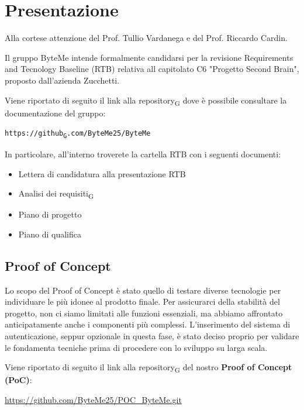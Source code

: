 \documentclass[11pt,a4paper]{article}
\newcommand{\gls}[1]{#1\textsubscript{G}}
\begin{document}
\newpage

\tableofcontents
\thispagestyle{empty}
\newpage

\setcounter{page}{1}

\section{Presentazione}
Alla cortese attenzione del Prof. Tullio Vardanega e del Prof. Riccardo Cardin.

Il gruppo ByteMe intende formalmente candidarsi per la revisione Requirements and Tecnology Baseline (RTB) relativa all capitolato C6 "Progetto Second Brain", proposto dall'azienda Zucchetti.

Viene riportato di seguito il link alla \gls{repository} dove è possibile consultare la documentazione del gruppo:
\begin{center}
\texttt{https://\gls{github}.com/ByteMe25/ByteMe}
\end{center}

\noindent In particolare, all'interno troverete la cartella RTB con i seguenti documenti:
\begin{itemize}
    \item Lettera di candidatura alla presentazione RTB
    \item \gls{Analisi dei requisiti}
    \item Piano di progetto
    \item Piano di qualifica
\end{itemize}


\subsection{Proof of Concept}
Lo scopo del Proof of Concept è stato quello di testare diverse tecnologie per individuare le più idonee al prodotto finale. Per assicurarci della stabilità del progetto, non ci siamo limitati alle funzioni essenziali, ma abbiamo affrontato anticipatamente anche i componenti più complessi. L'inserimento del sistema di autenticazione, seppur opzionale in questa fase, è stato deciso proprio per validare le fondamenta tecniche prima di procedere con lo sviluppo su larga scala.

Viene riportato di seguito il link alla \gls{repository} del nostro \textbf{Proof of Concept (PoC)}:
\begin{center}
\url{https://github.com/ByteMe25/POC_ByteMe.git}
\end{center}
\end{document}
